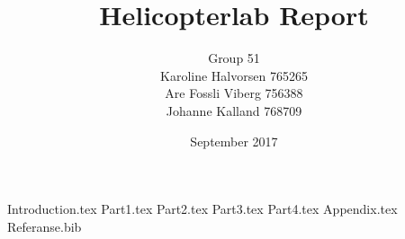 \documentclass[11pt,a4paper]{article}
\title{Helicopterlab Report}
\author{Group 51 \\Karoline Halvorsen 765265\\ Are Fossli Viberg 756388\\ Johanne Kalland 768709}
\date{September 2017}
\numberwithin{equation}{section}
\begin{document}
\maketitle
\newpage
\tableofcontents

\newpage
\setcounter{page}{1}
{Introduction.tex}
\newpage
{Part1.tex}
\newpage
{Part2.tex}
\newpage
{Part3.tex}
\newpage
{Part4.tex}
\newpage
{Appendix.tex}
\newpage
{Referanse.bib}
\end{document}
